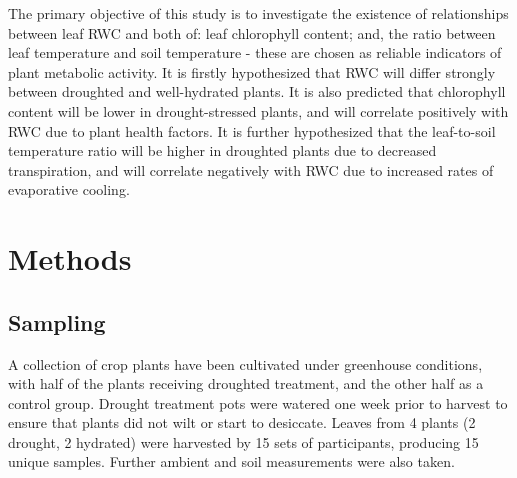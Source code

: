 \documentclass{report}
\begin{document}
\hspace{24pt}The primary objective of this study is to investigate the existence of relationships between leaf RWC and both of: leaf chlorophyll content; and, the ratio between leaf temperature and soil temperature - these are chosen as reliable indicators of plant metabolic activity. It is firstly hypothesized that RWC will differ strongly between droughted and well-hydrated plants. It is also predicted that chlorophyll content will be lower in drought-stressed plants, and will correlate positively with RWC due to plant health factors. It is further hypothesized that the leaf-to-soil temperature ratio will be higher in droughted plants due to decreased transpiration, and will correlate negatively with RWC due to increased rates of evaporative cooling.

\clearpage

\section{Methods}


\subsection{Sampling}

\hspace{24pt}A collection of crop plants have been cultivated under greenhouse conditions, with half of the plants receiving droughted treatment, and the other half as a control group. Drought treatment pots were watered one week prior to harvest to ensure that plants did not wilt or start to desiccate. Leaves from 4 plants (2 drought, 2 hydrated) were harvested by 15 sets of participants, producing 15 unique samples. Further ambient and soil measurements were also taken.

\end{document}
